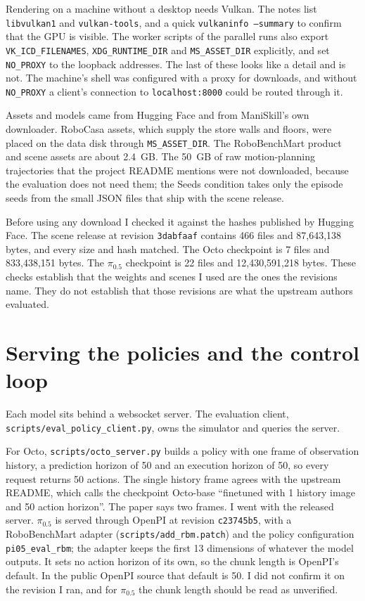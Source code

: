 Rendering on a machine without a desktop needs Vulkan. The notes list \texttt{libvulkan1} and \texttt{vulkan-tools}, and a quick \texttt{vulkaninfo --summary} to confirm that the GPU is visible. The worker scripts of the parallel runs also export \texttt{VK\_ICD\_FILENAMES}, \texttt{XDG\_RUNTIME\_DIR} and \texttt{MS\_ASSET\_DIR} explicitly, and set \texttt{NO\_PROXY} to the loopback addresses. The last of these looks like a detail and is not. The machine's shell was configured with a proxy for downloads, and without \texttt{NO\_PROXY} a client's connection to \texttt{localhost:8000} could be routed through it.

Assets and models came from Hugging Face and from ManiSkill's own downloader. RoboCasa assets, which supply the store walls and floors, were placed on the data disk through \texttt{MS\_ASSET\_DIR}. The RoboBenchMart product and scene assets are about 2.4~GB. The 50~GB of raw motion-planning trajectories that the project README mentions were not downloaded, because the evaluation does not need them; the Seeds condition takes only the episode seeds from the small JSON files that ship with the scene release.

Before using any download I checked it against the hashes published by Hugging Face. The scene release at revision \texttt{3dabfaaf} contains 466 files and 87,643,138 bytes, and every size and hash matched. The Octo checkpoint is 7 files and 833,438,151 bytes. The $\pi_{0.5}$ checkpoint is 22 files and 12,430,591,218 bytes. These checks establish that the weights and scenes I used are the ones the revisions name. They do not establish that those revisions are what the upstream authors evaluated.

\section{Serving the policies and the control loop}
\label{sec:control}

Each model sits behind a websocket server. The evaluation client, \texttt{scripts/eval\_policy\_client.py}, owns the simulator and queries the server.

For Octo, \texttt{scripts/octo\_server.py} builds a policy with one frame of observation history, a prediction horizon of 50 and an execution horizon of 50, so every request returns 50 actions. The single history frame agrees with the upstream README, which calls the checkpoint Octo-base ``finetuned with 1 history image and 50 action horizon''. The paper says two frames. I went with the released server. $\pi_{0.5}$ is served through OpenPI at revision \texttt{c23745b5}, with a RoboBenchMart adapter (\texttt{scripts/add\_rbm.patch}) and the policy configuration \texttt{pi05\_eval\_rbm}; the adapter keeps the first 13 dimensions of whatever the model outputs. It sets no action horizon of its own, so the chunk length is OpenPI's default. In the public OpenPI source that default is 50. I did not confirm it on the revision I ran, and for $\pi_{0.5}$ the chunk length should be read as unverified.

